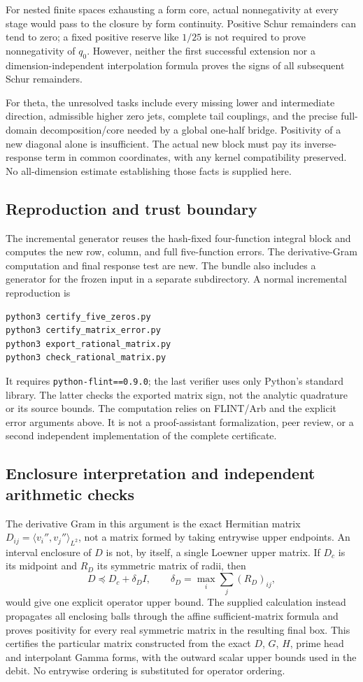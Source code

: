 \documentclass[11pt,a4paper]{article}
\numberwithin{equation}{section}
\theoremstyle{definition}\newtheorem{definition}[theorem]{Definition}
\theoremstyle{remark}\newtheorem{remark}[theorem]{Remark}
\begin{document}
For nested finite spaces exhausting a form core, actual nonnegativity
at every stage would pass to the closure by form continuity. Positive
Schur remainders can tend to zero; a fixed positive reserve like $1/25$
is not required to prove nonnegativity of $q_0$. However, neither the
first successful extension nor a dimension-independent interpolation
formula proves the signs of all subsequent Schur remainders.

For theta, the unresolved tasks include every missing lower and
intermediate direction, admissible higher zero jets, complete tail
couplings, and the precise full-domain decomposition/core needed by a
global one-half bridge. Positivity of a new diagonal alone is insufficient.
The actual new block must pay its inverse-response term in common
coordinates, with any kernel compatibility preserved. No all-dimension
estimate establishing those facts is supplied here.

\subsection{Reproduction and trust boundary}
The incremental generator reuses the hash-fixed four-function integral
block and computes the new row, column, and full five-function errors.
The derivative-Gram computation and final response test are new.
The bundle also includes a generator for the frozen input in a separate
subdirectory. A normal incremental reproduction is
\begin{verbatim}
python3 certify_five_zeros.py
python3 certify_matrix_error.py
python3 export_rational_matrix.py
python3 check_rational_matrix.py
\end{verbatim}
It requires \texttt{python-flint==0.9.0}; the last verifier uses only
Python's standard library. The latter checks the exported matrix sign,
not the analytic quadrature or its source bounds. The computation relies
on FLINT/Arb and the explicit error arguments above. It is not a
proof-assistant formalization, peer review, or a second independent
implementation of the complete certificate.


\subsection{Enclosure interpretation and independent arithmetic checks}

The derivative Gram in this argument is the exact Hermitian matrix
$D_{ij}=\langle v_i'',v_j''\rangle_{L^2}$, not a matrix formed by taking
entrywise upper endpoints. An interval enclosure of $D$ is not, by itself,
a single Loewner upper matrix. If $D_c$ is its midpoint and $R_D$ its
symmetric matrix of radii, then
\[
 D\preceq D_c+\delta_D I,\qquad
 \delta_D=\max_i\sum_j(R_D)_{ij},
\]
would give one explicit operator upper bound. The supplied calculation
instead propagates all enclosing balls through the affine sufficient-matrix
formula and proves positivity for every real symmetric matrix in the
resulting final box. This certifies the particular matrix constructed from
the exact $D$, $G$, $H$, prime head and interpolant Gamma forms, with the
outward scalar upper bounds used in the debit. No entrywise ordering is
substituted for operator ordering.
\end{document}
